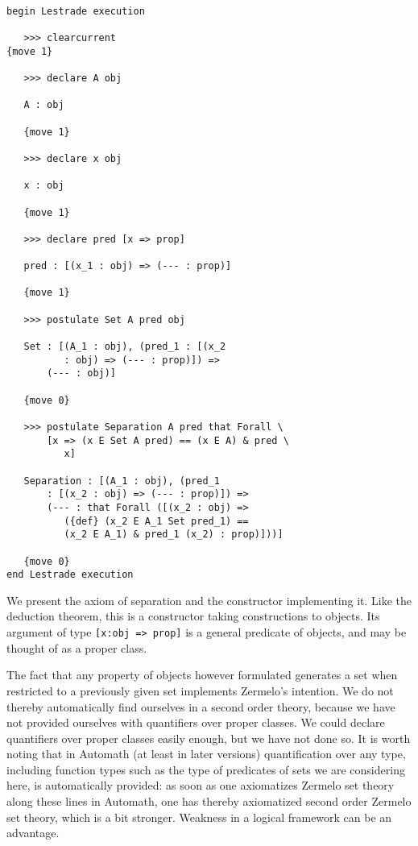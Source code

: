 \documentclass[12pt]{article}
\begin{document}
\begin{verbatim}

begin Lestrade execution

   >>> clearcurrent
{move 1}

   >>> declare A obj

   A : obj

   {move 1}

   >>> declare x obj

   x : obj

   {move 1}

   >>> declare pred [x => prop]

   pred : [(x_1 : obj) => (--- : prop)]

   {move 1}

   >>> postulate Set A pred obj

   Set : [(A_1 : obj), (pred_1 : [(x_2 
          : obj) => (--- : prop)]) => 
       (--- : obj)]

   {move 0}

   >>> postulate Separation A pred that Forall \
       [x => (x E Set A pred) == (x E A) & pred \
          x]

   Separation : [(A_1 : obj), (pred_1 
       : [(x_2 : obj) => (--- : prop)]) => 
       (--- : that Forall ([(x_2 : obj) => 
          ({def} (x_2 E A_1 Set pred_1) == 
          (x_2 E A_1) & pred_1 (x_2) : prop)]))]

   {move 0}
end Lestrade execution
\end{verbatim}

We present the axiom of separation and the constructor implementing it.  Like the deduction theorem, this is a constructor taking constructions to objects.
Its argument of type {\tt [x:obj => prop]} is a general predicate of objects, and may be thought of as a proper class.

The fact that any property of objects however formulated generates a set when restricted to a previously given set implements Zermelo's intention.  We do not thereby automatically find ourselves in a second order theory, because we have not provided ourselves with quantifiers over proper classes.  We could declare quantifiers over proper classes easily enough, but we have not done so.  It is worth noting that in Automath (at least in later versions) quantification over any type, including function types such as the type of predicates of sets we are considering here, is automatically provided:  as soon as one axiomatizes Zermelo set theory along these lines in Automath, one has thereby axiomatized second order Zermelo set theory, which is a bit stronger.  Weakness in a logical framework can be an advantage.
\end{document}
